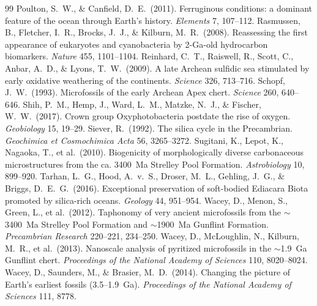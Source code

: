 \documentclass[11pt]{article}
\begin{document}
\begin{thebibliography}{99}
 Poulton, S.~W., \& Canfield, D.~E.\ (2011).
Ferruginous conditions: a dominant feature of the ocean through Earth's history. \textit{Elements} 7,
107--112.
 Rasmussen, B., Fletcher, I.~R., Brocks, J.~J., \&
Kilburn, M.~R.\ (2008). Reassessing the first appearance of eukaryotes and cyanobacteria by
2-Ga-old hydrocarbon biomarkers. \textit{Nature} 455, 1101--1104.
 Reinhard, C.~T., Raiswell, R., Scott, C., Anbar, A.~D.,
\& Lyons, T.~W.\ (2009). A late Archean sulfidic sea stimulated by early oxidative weathering of the
continents. \textit{Science} 326, 713--716.
 Schopf, J.~W.\ (1993). Microfossils of the early Archean Apex
chert. \textit{Science} 260, 640--646.
 Shih, P.~M., Hemp, J., Ward, L.~M., Matzke, N.~J., \& Fischer,
W.~W.\ (2017). Crown group Oxyphotobacteria postdate the rise of oxygen. \textit{Geobiology} 15,
19--29.
 Siever, R.\ (1992). The silica cycle in the Precambrian.
\textit{Geochimica et Cosmochimica Acta} 56, 3265--3272.
 Sugitani, K., Lepot, K., Nagaoka, T., et al.\ (2010).
Biogenicity of morphologically diverse carbonaceous microstructures from the ca. 3400~Ma Strelley
Pool Formation. \textit{Astrobiology} 10, 899--920.
 Tarhan, L.~G., Hood, A.~v.~S., Droser, M.~L., Gehling, J.~G.,
\& Briggs, D.~E.~G.\ (2016). Exceptional preservation of soft-bodied Ediacara Biota promoted by
silica-rich oceans. \textit{Geology} 44, 951--954.
 Wacey, D., Menon, S., Green, L., et al.\ (2012). Taphonomy of
very ancient microfossils from the $\sim$3400~Ma Strelley Pool Formation and $\sim$1900~Ma Gunflint
Formation. \textit{Precambrian Research} 220--221, 234--250.
 Wacey, D., McLoughlin, N., Kilburn, M.~R., et al.\ (2013).
Nanoscale analysis of pyritized microfossils in the $\sim$1.9~Ga Gunflint chert. \textit{Proceedings
of the National Academy of Sciences} 110, 8020--8024.
 Wacey, D., Saunders, M., \& Brasier, M.~D.\ (2014).
Changing the picture of Earth's earliest fossils (3.5--1.9~Ga). \textit{Proceedings of the National
Academy of Sciences} 111, 8778.
\end{thebibliography}
\end{document}
